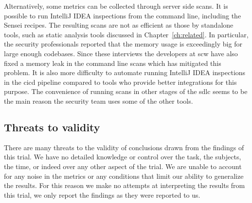 Alternatively, some metrics can be collected through server side scans.
It is possible to run IntelliJ IDEA inspections from the command line, including the Sensei recipes. 
The resulting scans are not as efficient as those by standalone tools, such as static analysis tools discussed in Chapter~\ref{ch:related}.
In particular, the security professionals reported that the memory usage is exceedingly big for large enough codebases.
Since these interviews the developers at \gls{scw} have also fixed a memory leak in the command line scans which has mitigated this problem.
It is also more difficulty to automate running IntelliJ IDEA inspections in the \gls{cicd} pipeline compared to tools who provide better integrations for this purpose.
The convenience of running scans in other stages of the \gls{sdlc} seems to be the main reason the security team uses some of the other tools.

%
%
%
\subsection{Threats to validity}
There are many threats to the validity of conclusions drawn from the findings of this trial. We have no detailed knowledge or control over the task, the subjects, the time, or indeed over any other aspect of the trial. We are unable to account for any noise in the metrics or any conditions that limit our ability to generalize the results. For this reason we make no attempts at interpreting the results from this trial, we only report the findings as they were reported to us.